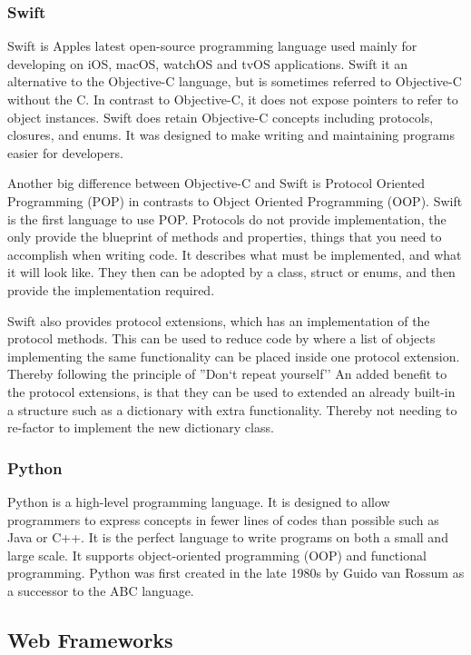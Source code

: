 \subsubsection{Swift}
Swift \cite{swift} is Apples latest open-source programming language used mainly for developing on iOS, macOS, watchOS and tvOS applications. Swift it an alternative to the Objective-C language, but is sometimes referred to Objective-C without the C. In contrast to Objective-C, it does not expose pointers to refer to object instances. Swift does retain Objective-C concepts including protocols, closures, and enums. It was designed to make writing and maintaining programs easier for developers.

Another big difference between Objective-C and Swift is Protocol Oriented Programming (POP) in contrasts to Object Oriented Programming (OOP). Swift is the first language to use POP. Protocols do not provide implementation, the only provide the blueprint of methods and properties, things that you need to accomplish when writing code. It describes what must be implemented, and what it will look like. They then can be adopted by a class, struct or enums, and then provide the implementation required.

Swift also provides protocol extensions, which has an implementation of the protocol methods. This can be used to reduce code by where a list of objects implementing the same functionality can be placed inside one protocol extension. Thereby following the principle of ''Don`t repeat yourself''  \cite{repeat} An added benefit to the protocol extensions, is that they can be used to extended an already built-in a structure such as a dictionary with extra functionality. Thereby not needing to re-factor to implement the new dictionary class.

\subsubsection{Python}
Python \cite{python} is a high-level programming language. It is designed to allow programmers to express concepts in fewer lines of codes than possible such as Java or C++. It is the perfect language to write programs on both a small and large scale. It supports object-oriented programming (OOP) and functional programming. Python was first created in the late 1980s by Guido van Rossum as a successor to the ABC language.

\subsection{Web Frameworks}

